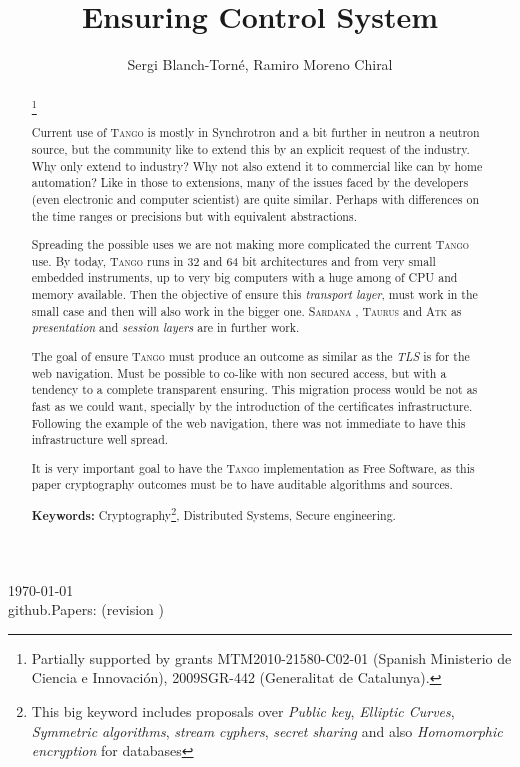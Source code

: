 \documentclass[10pt,a4paper,twoside]{llncs}
\title{Ensuring \tango Control System}
\author{Sergi Blanch-Torn\'e\inst{1}, Ramiro Moreno Chiral\inst{2}}
\institute{
 Escola Polit\`ecnica Superior, Universitat de Lleida. Spain.\\
 \email{\tt sblanch@alumnes.udl.es}
 \and 
 Departament de Matem\`atica. Universitat de Lleida. Spain.\\
 \email{\tt ramiro@matematica.udl.es}
 }
\newcommand{\version}{github.Papers: \gitCommitterDate\;(revision \gitAbbrevHash) }
\newcommand{\tango}{\textsc{Tango} }
\newcommand{\sardana}{\textsc{Sardana} }
\newcommand{\taurus}{\textsc{Taurus} }
\newcommand{\atk}{\textsc{Atk} }
\begin{document}
\maketitle
\begin{center}
 \today\\
 \version
\end{center}


\begin{abstract}\footnote{Partially supported by grants MTM2010-21580-C02-01 (Spanish Ministerio de Ciencia e Innovaci\'on), 2009SGR-442 (Generalitat de Catalunya).}

Current use of \tango is mostly in Synchrotron and a bit further in neutron a neutron source, but the community like to extend this by an explicit request of the industry. Why only extend to industry? Why not also extend it to commercial like can by home automation? Like in those to extensions, many of the issues faced by the developers (even electronic and computer scientist) are quite similar. Perhaps with differences on the time ranges or precisions but with equivalent abstractions.

Spreading the possible uses we are not making more complicated the current \tango use. By today, \tango runs in 32 and 64 bit architectures and from very small embedded instruments, up to very big computers with a huge among of CPU and memory available. Then the objective of ensure this \emph{transport layer}, must work in the small case and then will also work in the bigger one. \sardana, \taurus and \atk as \emph{presentation} and \emph{session layers} are in further work.

The goal of ensure \tango must produce an outcome as similar as the \emph{TLS} is for the web navigation. Must be possible to co-like with non secured access, but with a tendency to a complete transparent ensuring. This migration process would be not as fast as we could want, specially by the introduction of the certificates infrastructure. Following the example of the web navigation, there was not immediate to have this infrastructure well spread.

It is very important goal to have the \tango implementation as Free Software, as this paper cryptography outcomes must be to have auditable algorithms and sources.
   
{\bf Keywords:} Cryptography\footnote{This big keyword includes proposals over \emph{Public key}, \emph{Elliptic Curves}, \emph{Symmetric algorithms}, \emph{stream cyphers}, \emph{secret sharing} and also \emph{Homomorphic encryption} for databases}, Distributed Systems, Secure engineering.

\end{abstract}
\end{document}
